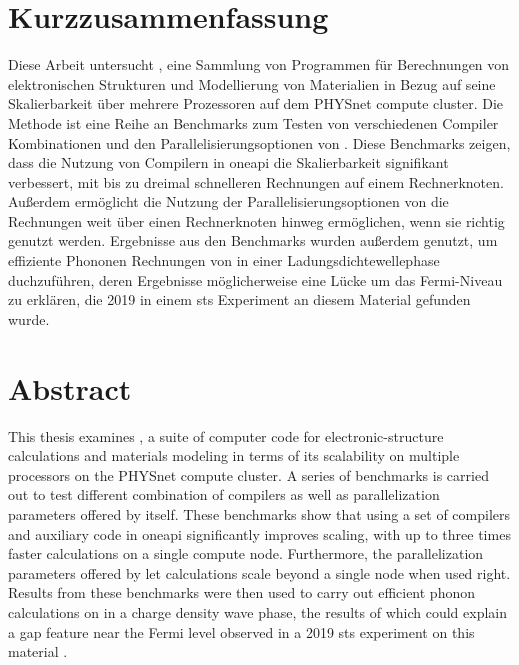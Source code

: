 \documentclass[main.tex]{subfiles}
\begin{document}
\section*{Kurzzusammenfassung}

Diese Arbeit untersucht \QE, eine Sammlung von Programmen für Berechnungen von elektronischen Strukturen und Modellierung von Materialien in Bezug auf seine Skalierbarkeit über mehrere Prozessoren auf dem PHYSnet compute cluster.
Die Methode ist eine Reihe an Benchmarks zum Testen von verschiedenen Compiler Kombinationen und den Parallelisierungsoptionen von \QE.
Diese Benchmarks zeigen, dass die Nutzung von Compilern in \gls{oneapi} die Skalierbarkeit signifikant verbessert, mit bis zu dreimal schnelleren Rechnungen auf einem Rechnerknoten.
Außerdem ermöglicht die Nutzung der Parallelisierungsoptionen von \QE die Rechnungen weit über einen Rechnerknoten hinweg ermöglichen, wenn sie richtig genutzt werden.
Ergebnisse aus den Benchmarks wurden außerdem genutzt, um effiziente Phononen Rechnungen von \TaS in einer Ladungsdichtewellephase duchzuführen, deren Ergebnisse möglicherweise eine Lücke um das Fermi-Niveau zu erklären, die 2019 in einem \gls{sts} Experiment an diesem Material \cite{hall_environmental_2019} gefunden wurde.

\section*{Abstract}

This thesis examines \QE, a suite of computer code for electronic-structure calculations and materials modeling in terms of its scalability on multiple processors on the PHYSnet compute cluster.
A series of benchmarks is carried out to test different combination of compilers as well as parallelization parameters offered by \QE itself.
These benchmarks show that using a set of compilers and auxiliary code in \gls{oneapi} significantly improves scaling, with up to three times faster calculations on a single compute node.
Furthermore, the parallelization parameters offered by \QE let calculations scale beyond a single node when used right.
Results from these benchmarks were then used to carry out efficient phonon calculations on \TaS in a charge density wave phase, the results of which could explain a gap feature near the Fermi level observed in a 2019 \gls{sts} experiment on this material \cite{hall_environmental_2019}.
\end{document}
